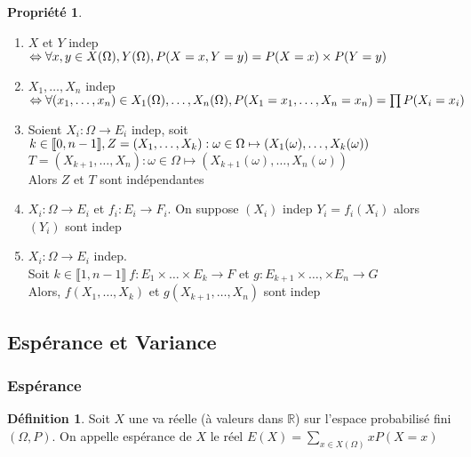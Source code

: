 \documentclass[fleqn]{article}
\theoremstyle{definition} \newtheorem*{defi}{D\'efinition}
\theoremstyle{definition} \newtheorem*{theo}{Th\'eor\`eme}
\theoremstyle{definition} \newtheorem*{coro}{Corollaire}
\theoremstyle{remark} \newtheorem*{rqs}{Remarques}
\theoremstyle{definition} \newtheorem*{prop}{Propri\'et\'e}
\begin{document}
\begin{prop} $ $
	\begin{enumerate}
		\item $X$ et $Y$ indep $\Leftrightarrow \forall x,y \in X(\Omega),Y(\Omega),\\ P(X=x, Y=y) = P(X=x)\times P(Y=y)$
		\item $X_1, \hdots, X_n$ indep $\Leftrightarrow \forall (x_1, \hdots, x_n) \in X_1(\Omega), \hdots, X_n(\Omega),\\ P(X_1=x_1, \hdots,
			X_n = x_n) = \prod P(X_i = x_i)$
		\item Soient $X_i: \Omega \rightarrow E_i$ indep, soit $k \in [\![0,n-1]\!],\\ Z=(X_1, \hdots, X_k): \omega \in \Omega \mapsto
			(X_1(\omega), \hdots, X_k(\omega))$\\
			$T= (X_{k+1}, \hdots, X_n): \omega \in \Omega \mapsto (X_{k+1}(\omega), \hdots, X_n(\omega))$\\
			Alors $Z$ et $T$ sont ind\'ependantes
		\item $X_i: \Omega \rightarrow E_i$ et $f_i : E_i \rightarrow F_i$. On suppose $(X_i)$ indep $Y_i = f_i(X_i)$ alors $(Y_i)$ sont indep
		\item $X_i: \Omega \rightarrow E_i$ indep. \\Soit $k \in \llbracket 1,n-1 \rrbracket\  f: E_1 \times \hdots \times E_k \rightarrow F $ et
			$g: E_{k+1} \times \hdots, \times E_n \rightarrow G$ \\
			Alors, $f(X_1, \hdots, X_k)$ et $g(X_{k+1}, \hdots, X_n)$ sont indep
	\end{enumerate}
\end{prop}

\subsection{Esp\'erance et Variance}
\subsubsection{Esp\'erance}

\begin{defi}
	Soit $X$ une va r\'eelle (\`a valeurs dans $\mathbb{R}$) sur l'espace probabilis\'e fini $(\Omega, P)$. On appelle esp\'erance de $X$
	le r\'eel $E(X) = \sum_{x \in X(\Omega)} xP(X=x)$
\end{defi}
\end{document}
